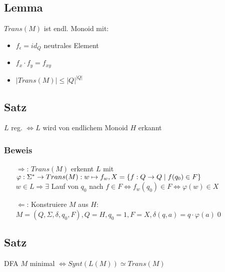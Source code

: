     \subsection{Lemma}
        $Trans(M)$ ist endl. Monoid mit:
        \begin{itemize}
            \item $f_\epsilon=id_Q$ neutrales Element
            \item $f_x\cdot f_y=f_{xy}$
            \item $|Trans(M)|\leq |Q|^{|Q|}$
        \end{itemize}
    \subsection{Satz}
        $L$ reg. $\Leftrightarrow L$ wird von endlichem Monoid $H$ erkannt
        \subsubsection{Beweis}
            \begin{itemize}
                \item[$\Rightarrow$:] $Trans(M)$ erkennt $L$ mit $\varphi:\Sigma^*\rightarrow Trans(M):w\mapsto f_w,\\ X=\{f:Q\rightarrow Q\mid f(q_0)\in F\}$\\
                $w\in L\Rightarrow\exists$ Lauf von $q_0$ nach $f\in F\Leftrightarrow f_w(q_0)\in F\Leftrightarrow\varphi(w)\in X$
                \item[$\Leftarrow$:] Konstruiere $M$ aus $H$:\\
                $M=(Q,\Sigma,\delta,q_0,F),Q=H,q_0=1,F=X,\delta(q,a)=q\cdot\varphi(a)$\qed
            \end{itemize}
    \subsection{Satz}
        DFA $M$ minimal $\Leftrightarrow Synt(L(M))\simeq Trans(M)$
